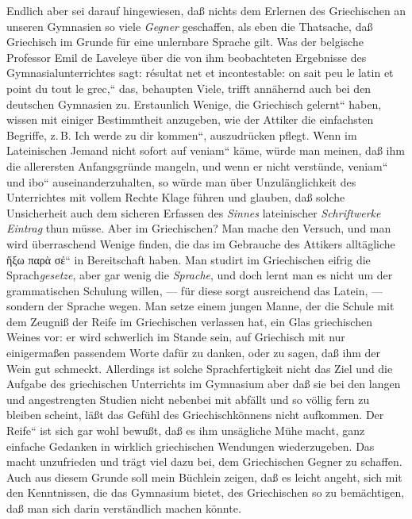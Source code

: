 Endlich aber sei darauf hingewiesen, daß nichts dem Erlernen des
Griechischen an unseren Gymnasien so viele \emph{Gegner} geschaffen,
als eben die Thatsache, daß Griechisch im Grunde für eine unlernbare
Sprache gilt. Was der belgische Professor Emil de Laveleye über die
von ihm beobachteten Ergebnisse des Gymnasial\textcompwordmark{}unter\textcompwordmark{}richtes
sagt: \quotedblbase \textfrench{résultat net et incontestable: on
sait peu le latin et point du tout le grec,}`` das, behaupten Viele,
trifft annähernd auch bei den deutschen Gymnasien zu. Erstaunlich
Wenige, die \quotedblbase Griechisch gelernt`` haben, wissen mit
einiger Bestimmt\textcompwordmark{}heit anzugeben, wie der Attiker
die einfachsten Begriffe, z.\,B. \quotedblbase Ich werde zu dir
kommen``, aus\textcompwordmark{}zudrücken pflegt. Wenn im Lateinischen
Jemand nicht sofort auf \quotedblbase \textlatin{veniam}`` käme,
würde man meinen, daß ihm die allerersten Anfangs\textcompwordmark{}gründe
mangeln, und wenn er nicht verstünde, \quotedblbase \textlatin{veniam}``
und \quotedblbase \textlatin{ibo}`` aus\textcompwordmark{}ein\textcompwordmark{}an\textcompwordmark{}der\textcompwordmark{}zu\textcompwordmark{}halten,
so würde man über Unzulänglichkeit des Unterrichtes mit vollem Rechte
Klage führen und glauben, daß solche Unsicherheit auch dem sicheren
Erfassen des \emph{Sinnes} lateinischer \emph{Schriftwerke Eintrag
}thun müsse. Aber  im Griechischen? Man mache den Versuch, und man
wird überraschend Wenige finden, die das im Gebrauche des Attikers
alltägliche \quotedblbase \textgreek[variant=ancient]{ἥξω παρὰ σέ}``
in Be\textcompwordmark{}reit\textcompwordmark{}schaft haben. Man
studirt im Griechischen eifrig die Sprach\emph{gesetze}, aber gar
wenig die \emph{Sprache}, und doch lernt man es nicht um der grammatischen
Schulung willen, --- für diese sorgt aus\textcompwordmark{}reichend
das Latein, --- sondern der Sprache wegen. Man setze einem jungen
Manne, der die Schule  mit dem Zeugniß der Reife im Griechischen
verlassen hat, ein Glas griechischen Weines vor: er wird schwerlich
im Stande sein, auf Griechisch mit nur einigermaßen passendem Worte
dafür zu danken, oder zu sagen, daß ihm der Wein gut schmeckt. Allerdings
ist solche Sprachfertigkeit nicht das Ziel und die Aufgabe des griechischen
Unterrichts im Gymnasium aber daß sie bei den langen und angestrengten
Studien nicht nebenbei mit abfällt und so völlig fern zu bleiben
scheint, läßt das Gefühl des Griechischkönnens nicht aufkommen. Der
\quotedblbase Reife`` ist sich gar wohl bewußt, daß es ihm unsägliche
Mühe macht, ganz einfache Gedanken in wirklich griechischen Wendungen
wiederzugeben. Das macht unzufrieden und trägt viel dazu bei, dem
Griechischen Gegner zu schaffen. Auch aus diesem Grunde soll mein
Büchlein zeigen, daß es leicht angeht, sich mit den Kenntnissen,
die das Gymnasium bietet, des Griechischen so zu bemächtigen, daß
man sich darin verständlich machen könnte. 

